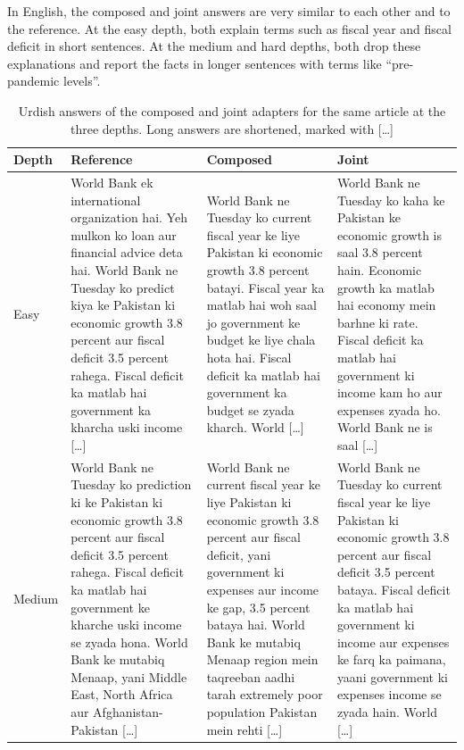 \documentclass{FastFyp}
\begin{document}
In English, the composed and joint answers are very similar to each other and to the reference. At the easy depth, both explain terms such as fiscal year and fiscal deficit in short sentences. At the medium and hard depths, both drop these explanations and report the facts in longer sentences with terms like ``pre-pandemic levels''.

\begin{table}[H]
\centering
\caption{Urdish answers of the composed and joint adapters for the same article at the three depths. Long answers are shortened, marked with [\dots]}
\label{tab:comp-out-urdish}
\footnotesize
\begin{tabular}{|p{}|p{}|p{}|p{}|}
\hline
\textbf{Depth} & \textbf{Reference} & \textbf{Composed} & \textbf{Joint} \\ \hline
Easy & World Bank ek international organization hai. Yeh mulkon ko loan aur financial advice deta hai. World Bank ne Tuesday ko predict kiya ke Pakistan ki economic growth 3.8 percent aur fiscal deficit 3.5 percent rahega. Fiscal deficit ka matlab hai government ka kharcha uski income [\dots] & World Bank ne Tuesday ko current fiscal year ke liye Pakistan ki economic growth 3.8 percent batayi. Fiscal year ka matlab hai woh saal jo government ke budget ke liye chala hota hai. Fiscal deficit ka matlab hai government ka budget se zyada kharch. World [\dots] & World Bank ne Tuesday ko kaha ke Pakistan ke economic growth is saal 3.8 percent hain. Economic growth ka matlab hai economy mein barhne ki rate. Fiscal deficit ka matlab hai government ki income kam ho aur expenses zyada ho. World Bank ne is saal [\dots] \\ \hline
Medium & World Bank ne Tuesday ko prediction ki ke Pakistan ki economic growth 3.8 percent aur fiscal deficit 3.5 percent rahega. Fiscal deficit ka matlab hai government ke kharche uski income se zyada hona. World Bank ke mutabiq Menaap, yani Middle East, North Africa aur Afghanistan-Pakistan [\dots] & World Bank ne current fiscal year ke liye Pakistan ki economic growth 3.8 percent aur fiscal deficit, yani government ki expenses aur income ke gap, 3.5 percent bataya hai. World Bank ke mutabiq Menaap region mein taqreeban aadhi tarah extremely poor population Pakistan mein rehti [\dots] & World Bank ne Tuesday ko current fiscal year ke liye Pakistan ki economic growth 3.8 percent aur fiscal deficit 3.5 percent bataya. Fiscal deficit ka matlab hai government ki income aur expenses ke farq ka paimana, yaani government ki expenses income se zyada hain. World [\dots] \\ \hline

\end{tabular}
\end{table}
\end{document}
